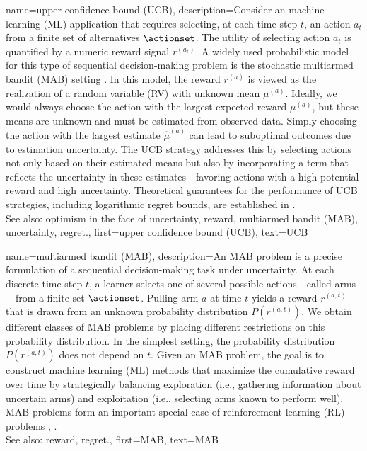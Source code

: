 {
{name={upper confidence bound (UCB)},
	description={Consider an machine learning (ML) 
		application that requires selecting, at each time step $t$, an action $a_{t}$ 
		from a finite set of alternatives $\actionset$. The utility of selecting action $a_{t}$ 
		is quantified by a numeric reward signal $r^{(a_{t})}$. 
		A widely used probabilistic model for this type of sequential decision-making problem 
		is the stochastic multiarmed bandit (MAB) setting \cite{Bubeck2012}. In this model, 
		the reward $r^{(a)}$ is viewed as the realization of a random variable (RV) 
		with unknown mean $\mu^{(a)}$. Ideally, we would always choose the 
		action with the largest expected reward $\mu^{(a)}$, but these 
		means are unknown and must be estimated from observed data. Simply 
		choosing the action with the largest estimate $\widehat{\mu}^{(a)}$ can 
		lead to suboptimal outcomes due to estimation uncertainty. The UCB strategy 
		addresses this by selecting actions not only based on their estimated means but 
		also by incorporating a term that reflects the uncertainty in these estimates—favoring 
		actions with a high-potential reward and high uncertainty. Theoretical guarantees 
		for the performance of UCB strategies, including logarithmic regret bounds, are established in \cite{Bubeck2012}.
					\\ 
		See also: optimism in the face of uncertainty, reward, multiarmed bandit (MAB), uncertainty, regret.},
	first={upper confidence bound (UCB)},
	text={UCB} 
}

{name={multiarmed bandit (MAB)},
	description={An MAB  problem is a precise 
	formulation of a sequential decision-making task under uncertainty. At each 
	discrete time step $t$, a learner selects one of several possible 
	actions—called arms—from a finite set $\actionset$. Pulling arm $a$ at time 
	$t$ yields a reward $r^{(a,t)}$ that is drawn from an unknown 
	probability distribution $P\left(r^{(a,t)}\right)$. We obtain different classes 
	of MAB problems by placing different restrictions on this probability distribution. In the simplest 
	setting, the probability distribution $P\left(r^{(a,t)}\right)$ does not depend on $t$. 
		Given an MAB problem, the goal is to construct machine learning (ML) methods that maximize the cumulative 
		reward over time by strategically balancing exploration (i.e., gathering information 
		about uncertain arms) and exploitation (i.e., selecting arms known to perform well). 
		MAB problems form an important special case of reinforcement learning (RL) problems \cite{Bubeck2012}, \cite{SuttonEd2}.
					\\ 
		See also: reward, regret.},
	first={MAB},
	text={MAB}
}



}
